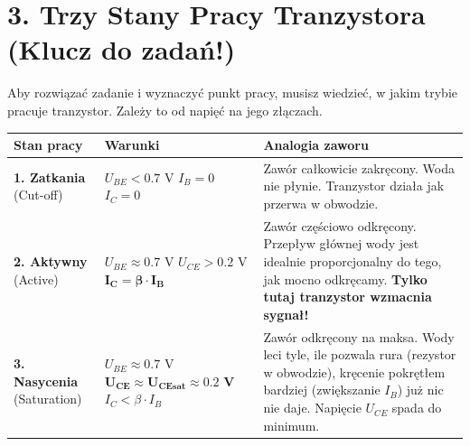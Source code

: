 \documentclass[11pt, a4paper]{article}
\begin{document}
\section*{3. Trzy Stany Pracy Tranzystora (Klucz do zadań!)}
Aby rozwiązać zadanie i wyznaczyć punkt pracy, musisz wiedzieć, w jakim trybie pracuje tranzystor. Zależy to od napięć na jego złączach.

\begin{center}
    \begin{tabular}{lp{5cm}p{7cm}}
        \toprule
        \textbf{Stan pracy}                & \textbf{Warunki}                                                                                                                 & \textbf{Analogia zaworu}                                                                                                                                                                \\
        \midrule
        \textbf{1. Zatkania} (Cut-off)     & $U_{BE} < 0.7\text{ V}$ \newline $I_B = 0$ \newline $I_C = 0$                                                                    & Zawór całkowicie zakręcony. Woda nie płynie. Tranzystor działa jak przerwa w obwodzie.                                                                                                  \\
        \midrule
        \textbf{2. Aktywny} (Active)       & $U_{BE} \approx 0.7\text{ V}$ \newline $U_{CE} > 0.2\text{ V}$ \newline $\mathbf{I_C = \beta \cdot I_B}$                         & Zawór częściowo odkręcony. Przepływ głównej wody jest idealnie proporcjonalny do tego, jak mocno odkręcamy. \textbf{Tylko tutaj tranzystor wzmacnia sygnał!}                            \\
        \midrule
        \textbf{3. Nasycenia} (Saturation) & $U_{BE} \approx 0.7\text{ V}$ \newline $\mathbf{U_{CE} \approx U_{CEsat} \approx 0.2\text{ V}}$ \newline $I_C < \beta \cdot I_B$ & Zawór odkręcony na maksa. Wody leci tyle, ile pozwala rura (rezystor w obwodzie), kręcenie pokrętłem bardziej (zwiększanie $I_B$) już nic nie daje. Napięcie $U_{CE}$ spada do minimum. \\
        \bottomrule
    \end{tabular}
\end{center}
\end{document}
